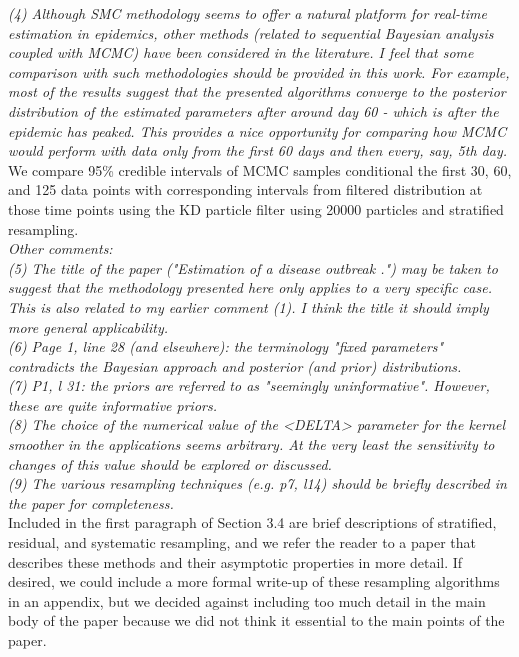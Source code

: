 \documentclass{article}
\begin{document}
\noindent \emph{(4) Although SMC methodology seems to offer a natural platform for real-time estimation in epidemics, other methods (related to sequential Bayesian analysis coupled with MCMC) have been considered in the literature. I feel that some comparison with such methodologies should be provided in this work. For example, most of the results suggest that the presented algorithms converge to the posterior distribution of the estimated parameters after around day 60 - which is after the epidemic has peaked. This provides a nice opportunity for comparing how MCMC would perform with data only from the first 60 days and then every, say, 5th day.} \\

We compare 95\% credible intervals of MCMC samples conditional the first 30, 60, and 125 data points with corresponding intervals from filtered distribution at those time points using the KD particle filter using 20000 particles and stratified resampling. \\

\noindent \emph{Other comments:} \\

\noindent \emph{(5) The title of the paper  ("Estimation of a disease outbreak .") may be taken to suggest that the methodology presented here only applies to a very specific case. This is also related to my earlier comment (1). I think the title  it should imply more general applicability.} \\

\noindent \emph{(6) Page 1, line 28 (and elsewhere): the terminology "fixed parameters" contradicts the Bayesian approach and posterior (and prior) distributions.} \\

\noindent \emph{(7) P1, l 31: the priors are referred to as "seemingly uninformative". However, these are quite informative priors.} \\

\noindent \emph{(8) The choice of the numerical value of the <DELTA> parameter for the kernel smoother in the applications seems arbitrary. At the very least the sensitivity to changes of this value should be explored or discussed.} \\

\noindent \emph{(9) The various resampling techniques (e.g. p7, l14) should be briefly described in the paper for completeness.} \\

Included in the first paragraph of Section 3.4 are brief descriptions of stratified, residual, and systematic resampling, and we refer the reader to a paper that describes these methods and their asymptotic properties in more detail. If desired, we could include a more formal write-up of these resampling algorithms in an appendix, but we decided against including too much detail in the main body of the paper because we did not think it essential to the main points of the paper. \\
\end{document}

